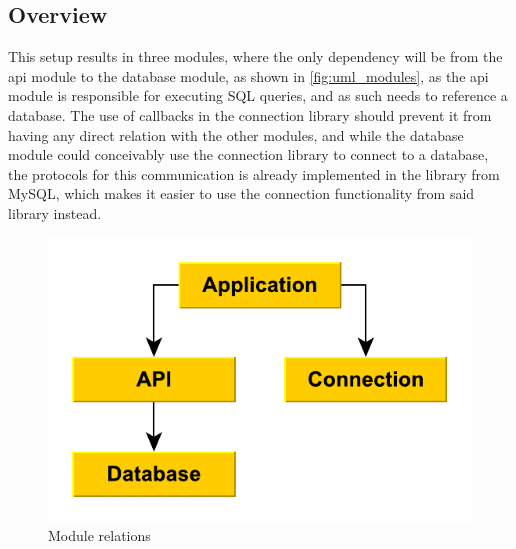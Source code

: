 \subsection{Overview}

This setup results in three modules, where the only dependency will be from the \ac{api} module to the database module, as shown in \autoref{fig:uml_modules}, as the \ac{api} module is responsible for executing SQL queries, and as such needs to reference a database.
The use of callbacks in the connection library should prevent it from having any direct relation with the other modules, and while the database module could conceivably use the connection library to connect to a database,
the protocols for this communication is already implemented in the library from MySQL, which makes it easier to use the connection functionality from said library instead.

\begin{figure}[ht]
\begin{center}
\includegraphics[scale=0.8]{img/modules.pdf}
\caption{Module relations}
\label{fig:uml_modules}
\end{center}
\end{figure}